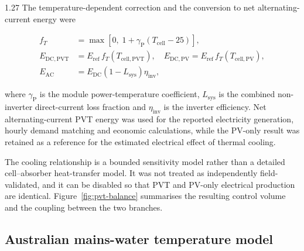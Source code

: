 \documentclass[12pt,letterpaper]{article}
\newcommand{\done}{\ \textcolor{green!45!black}{$\checkmark$}} %
\begin{document}
\begin{spacing}{1.27}
The temperature-dependent correction and the conversion to net alternating-current energy were

\begin{align}
f_T &= \max\left[0,\; 1+\gamma_{\mathrm{P}}\left(T_{\mathrm{cell}}-25\right)\right], \label{eq:ftemp}\\
E_{\mathrm{DC,PVT}} &= E_{\mathrm{ref}}\,f_T\!\left(T_{\mathrm{cell,PVT}}\right), \quad E_{\mathrm{DC,PV}} = E_{\mathrm{ref}}\,f_T\!\left(T_{\mathrm{cell,PV}}\right), \label{eq:edc}\\
E_{\mathrm{AC}} &= E_{\mathrm{DC}}\left(1-L_{\mathrm{sys}}\right)\eta_{\mathrm{inv}}, \label{eq:eac}
\end{align}

\noindent where $\gamma_{\mathrm{P}}$ is the module power-temperature coefficient, $L_{\mathrm{sys}}$ is the combined non-inverter direct-current loss fraction and $\eta_{\mathrm{inv}}$ is the inverter efficiency. Net alternating-current PVT energy was used for the reported electricity generation, hourly demand matching and economic calculations, while the PV-only result was retained as a reference for the estimated electrical effect of thermal cooling.\par

\vspace{0.15in}

The cooling relationship is a bounded sensitivity model rather than a detailed cell--absorber heat-transfer model. It was not treated as independently field-validated, and it can be disabled so that PVT and PV-only electrical production are identical. Figure~\ref{fig:pvt-balance} summarises the resulting control volume and the coupling between the two branches.\par
\end{spacing}


\subsection[Australian mains-water temperature model\done]{Australian mains-water temperature model}\label{sec23}
\end{document}
